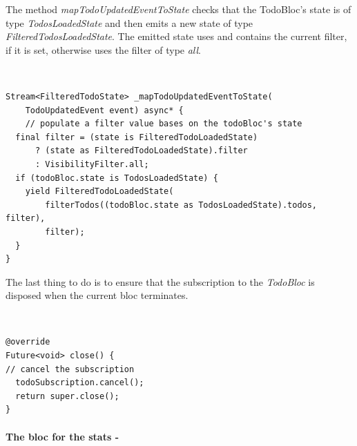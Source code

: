 The method \textit{mapTodoUpdatedEventToState} checks that the TodoBloc’s state is of type \textit{TodosLoadedState} and then emits a new state of type \textit{FilteredTodosLoadedState}. The emitted state uses and contains the current filter, if it is set, otherwise uses the filter of type \textit{all}.
\begin{code}
\mbox{}\\
 \mbox{}
\label{code:2.14}
\begin{verbatim}
Stream<FilteredTodoState> _mapTodoUpdatedEventToState(
    TodoUpdatedEvent event) async* {
    // populate a filter value bases on the todoBloc's state
  final filter = (state is FilteredTodoLoadedState)
      ? (state as FilteredTodoLoadedState).filter
      : VisibilityFilter.all;
  if (todoBloc.state is TodosLoadedState) {
    yield FilteredTodoLoadedState(
        filterTodos((todoBloc.state as TodosLoadedState).todos, filter),
        filter);
  }
}
\end{verbatim}
\mbox{}
\end{code}

The last thing to do is to ensure that the subscription to the \textit{TodoBloc} is disposed when the current bloc terminates.
\begin{code}
\mbox{}\\
 \mbox{}
\label{code:2.14}
\begin{verbatim}
@override
Future<void> close() {
// cancel the subscription
  todoSubscription.cancel();
  return super.close();
}
\end{verbatim}

\end{code}


\paragraph{The bloc for the stats - }
\label{subpar:todo_app_bloc_core_state}

